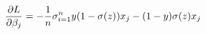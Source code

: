 \documentclass[preview]{standalone}
\begin{document}
\begin{align*}
\special{dvisvgm:raw <g id='unique000'>}\frac{\partial{L}}{\partial\beta_j}=-\frac{1}{n}\sigma^n_{i=1}y(1-\sigma(z))x_j-(1-y)\sigma(z)x_j\special{dvisvgm:raw </g>}
\end{align*}
\end{document}
